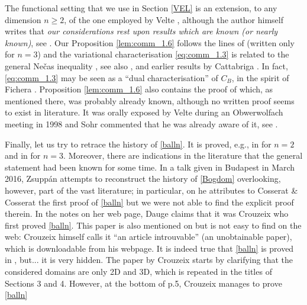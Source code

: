 \documentclass[11pt]{article}
\theoremstyle{plain}
\theoremstyle{definition}
\numberwithin{equation}{section}
\begin{document}
The functional setting that we use in Section \ref{VEL} is an extension, to any dimension $n\ge2$, of the one employed by Velte \cite{Velte_LNM1431_1990}, although the author himself writes that
{\em our considerations rest upon results which are known (or nearly known)}, see \cite[p.159]{Velte_LNM1431_1990}.
Our Proposition \ref{lem:comm_1.6} follows the lines of \cite[Proposition 1'']{Velte_LNM1431_1990} (written only for $n=3$)
and the variational characterisation \eqref{eq:comm_1.3} is related to the general Ne\v{c}as inequality
\cite{Necas_ineq}, see also \cite[Lemme 3.7.1]{nevcasmethodes}, \cite[Exercise III.3.4]{galdi2011introduction} and earlier results by Cattabriga \cite[pp.312-313]{cattabriga1961problema}.
In fact, \eqref{eq:comm_1.3} may be seen as a ``dual characterisation'' of $C_B$, in the spirit of Fichera \cite{fichera}.
Proposition \ref{lem:comm_1.6} also contains the proof of \cite[Theorem 1]{Velte_LNM1431_1990} which, as mentioned there,
was probably already known, although no written proof seems to exist in literature. It was orally exposed by Velte during an Obwerwolfach
meeting in 1998 and Sohr commented that he was already aware of it, see \cite[Remark, p.162]{Velte_LNM1431_1990}.\par
Finally, let us try to retrace the history of \eqref{balln}. It is proved, e.g., in  \cite[Section 6]{horgan} for $n=2$ and in
\cite[Theorem 2]{Velte_LNM1431_1990} for $n=3$. Moreover, there are indications in the literature that the general statement had been known
for some time. In a talk given in Budapest in March 2016, Zsupp\'an \cite[p.4]{zsuppanslides} attempts to reconstruct the history of
\eqref{Bogdom} overlooking, however, part of the vast literature; in particular, on \cite[p.14]{zsuppanslides} he attributes to Cosserat
\& Cosserat \cite{Cosserat_18986} the first proof of \eqref{balln} but we were not able to find the explicit proof therein.
In the notes on her web page, Dauge \cite[p.2]{Daugeweb} claims that it was Crouzeix \cite{Crouzeix_1997} who first proved \eqref{balln}.
This paper is also mentioned on \cite[p.4]{zsuppanslides} but is not easy to find on the web: Crouzeix himself calls it
``an article introuvable'' (an unobtainable paper), which is downloadable from his webpage. It is indeed true that \eqref{balln} is proved in \cite{Crouzeix_1997}, but... it is very hidden. The paper by Crouzeix \cite{Crouzeix_1997} starts by clarifying that the considered domains are
only 2D and 3D, which is repeated in the titles of Sections 3 and 4. However, at the bottom of p.5, Crouzeix manages to prove \eqref{balln}
\end{document}
